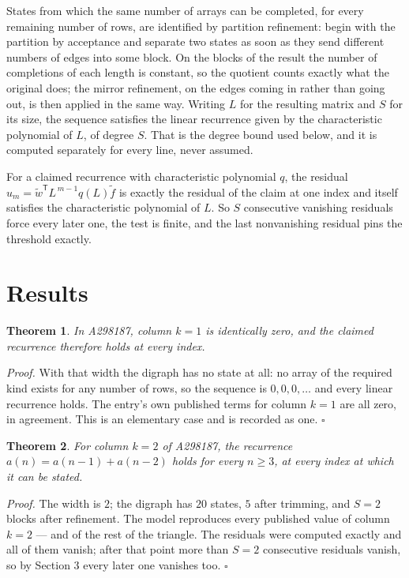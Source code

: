 \documentclass[11pt]{article}
\newtheorem{theorem}{Theorem}
\theoremstyle{definition}
\begin{document}
States from which the same number of arrays can be completed, for every remaining number of rows, are identified by partition refinement: begin with the partition by acceptance and separate two states as soon as they send different numbers of edges into some block. On the blocks of the result the number of completions of each length is constant, so the quotient counts exactly what the original does; the mirror refinement, on the edges coming in rather than going out, is then applied in the same way. Writing $L$ for the resulting matrix and $S$ for its size, the sequence satisfies the linear recurrence given by the characteristic polynomial of $L$, of degree $S$. That is the degree bound used below, and it is computed separately for every line, never assumed.

For a claimed recurrence with characteristic polynomial $q$, the residual $u_m = \tilde w^{\mathsf T}L^{\,m-1}q(L)\tilde f$ is exactly the residual of the claim at one index and itself satisfies the characteristic polynomial of $L$. So $S$ consecutive vanishing residuals force every later one, the test is finite, and the last nonvanishing residual pins the threshold exactly.

\section{Results}

\begin{theorem} In A298187, column $k = 1$ is identically zero, and the claimed recurrence therefore holds at every index.\end{theorem}

{\itshape Proof.} With that width the digraph has no state at all: no array of the required kind exists for any number of rows, so the sequence is $0,0,0,\dots$ and every linear recurrence holds. The entry's own published terms for column $k = 1$ are all zero, in agreement. This is an elementary case and is recorded as one. $\square$

\begin{theorem} For column $k = 2$ of A298187, the recurrence $a(n) = a(n-1) + a(n-2)$ holds for every $n \ge 3$, at every index at which it can be stated.\end{theorem}

{\itshape Proof.} The width is $2$; the digraph has $20$ states, $5$ after trimming, and $S = 2$ blocks after refinement. The model reproduces every published value of column $k = 2$ --- and of the rest of the triangle. The residuals were computed exactly and all of them vanish; after that point more than $S = 2$ consecutive residuals vanish, so by Section 3 every later one vanishes too. $\square$
\end{document}
